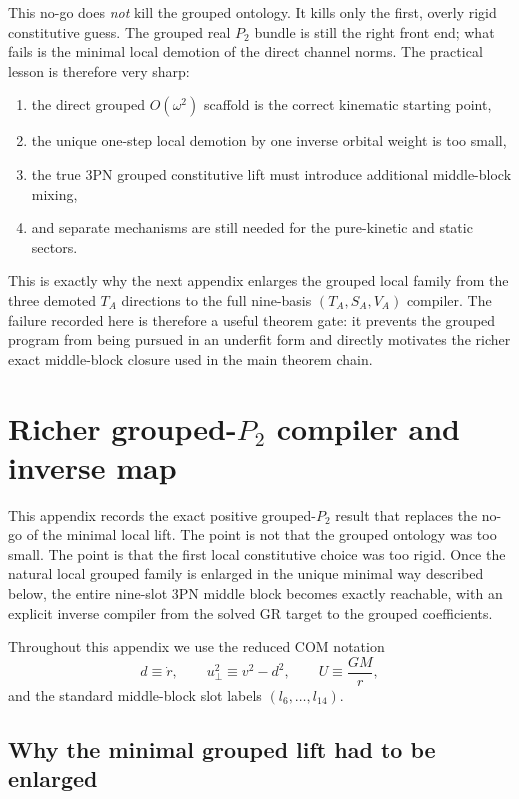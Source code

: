 \documentclass[11pt]{article}
\begin{document}
This no-go does \emph{not} kill the grouped ontology. It kills only the first, overly rigid constitutive guess. The grouped real $P_2$ bundle is still the right front end; what fails is the minimal local demotion of the direct channel norms. The practical lesson is therefore very sharp:
\begin{enumerate}
  \item the direct grouped $O(\omega^2)$ scaffold is the correct kinematic starting point,
  \item the unique one-step local demotion by one inverse orbital weight is too small,
  \item the true $3$PN grouped constitutive lift must introduce additional middle-block mixing,
  \item and separate mechanisms are still needed for the pure-kinetic and static sectors.
\end{enumerate}
This is exactly why the next appendix enlarges the grouped local family from the three demoted $T_A$ directions to the full nine-basis $(T_A,S_A,V_A)$ compiler. The failure recorded here is therefore a useful theorem gate: it prevents the grouped program from being pursued in an underfit form and directly motivates the richer exact middle-block closure used in the main theorem chain.

\section{Richer grouped-\texorpdfstring{$P_2$}{P 2} compiler and inverse map}
\label{app:richer_grouped_p2_compiler_inverse_map}

This appendix records the exact positive grouped-$P_2$ result that replaces the no-go of the minimal local lift. The point is not that the grouped ontology was too small. The point is that the first local constitutive choice was too rigid. Once the natural local grouped family is enlarged in the unique minimal way described below, the entire nine-slot $3$PN middle block becomes exactly reachable, with an explicit inverse compiler from the solved GR target to the grouped coefficients.

Throughout this appendix we use the reduced COM notation
\[
d \equiv \dot r,
\qquad
u_\perp^2 \equiv v^2-d^2,
\qquad
U \equiv \frac{GM}{r},
\]
and the standard middle-block slot labels $(l_6,\dots,l_{14})$.

\subsection{Why the minimal grouped lift had to be enlarged}
\label{app:richer_grouped_p2_compiler_inverse_map:motivation}
\end{document}

